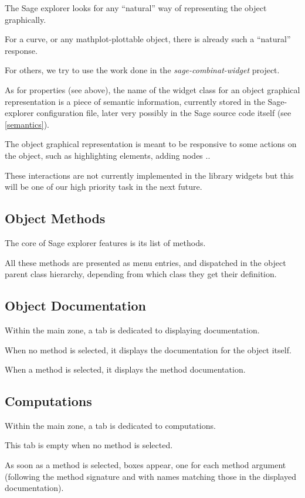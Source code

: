 \documentclass{deliverablereport}
\begin{document}
The Sage explorer looks for any ``natural'' way of representing the
object graphically.

For a curve, or any mathplot-plottable object, there is already such a
``natural'' response.

For others, we try to use the work done in the
\emph{sage-combinat-widget} project.

As for properties (see above), the name of the widget class for an
object graphical representation is a piece of semantic information,
currently stored in the Sage-explorer configuration file, later very
possibly in the Sage source code itself (see \ref{semantics}).

The object graphical representation is meant to be responsive to some
actions on the object, such as highlighting elements, adding nodes ..

These interactions are not currently implemented in the library widgets but
this will be one of our high priority task in the next future.

\subsection{Object Methods}

The core of Sage explorer features is its list of methods.

All these methods are presented as menu entries, and dispatched in the
object parent class hierarchy, depending from
which class they get their definition.

\subsection{Object Documentation}

Within the main zone, a tab is dedicated to displaying documentation.

When no method is selected, it displays the documentation for the object itself.

When a method is selected, it displays the method documentation.

\subsection{Computations}

Within the main zone, a tab is dedicated to computations.

This tab is empty when no method is selected.

As soon as a method is selected, boxes appear, one for each method
argument (following the method signature and with names matching those
in the displayed documentation).
\end{document}
